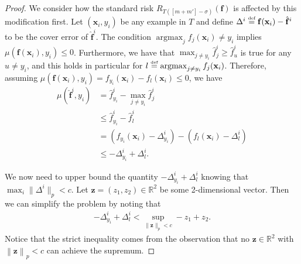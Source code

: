 \documentclass[twoside,11pt]{article}
\newcommand{\norm}[1]{\left\lVert#1\right\rVert}
\newcommand{\f}{\mathbf{f}}
\newcommand{\x}{\mathbf{x}}
\newcommand{\fhat}{\hat{\f}}
\newcommand{\z}{\mathbf{z}}
\newcommand{\reals}{\mathds{R}}
\newcommand{\eqdef}{\overset{\smash{\mbox{\tiny \rm def}}}{=}}
\DeclareMathOperator*{\argmax}{argmax}
\begin{document}
\begin{proof}
We consider how the standard risk $R_{T([m+m']-\sigma)}(\f)$ is affected by this modification first.
Let $(\x_i, y_i)$ be any example in $T$ and define $\Delta^i \eqdef \f(\x_i) - \fhat^i$ to be the cover error of $\fhat^i$.
The condition $\argmax_j f_j(\x_i) \neq y_i$ implies $\mu(\f(\x_i), y_i) \leq 0$.
Furthermore, we have that $\max_{j\ne y_i} \hat{f}_j^i \ge \hat{f}_u^i$ is true for any $u\ne y_i$, and this holds in particular for $l \eqdef \argmax_{j \neq y_i} f_{j}(\x_i)$.
Therefore, assuming $\mu(\f(\x_i), y_i) = f_{y_i}(\x_i) - f_{l}(\x_i) \leq 0$, we have
\begin{align}
    \mu(\fhat^i, y_i)
    &= \hat{f}^i_{y_i} - \max_{j\ne y_i} \hat{f}^i_j\nonumber\\
    &\le \hat{f}^i_{y_i} - \hat{f}^i_l\nonumber\\
    &= (f_{y_i}(\x_i) - \Delta_{y_i}^i) - (f_{l}(\x_i) - \Delta_{l}^i)\nonumber\\
    &\le - \Delta_{y_i}^i + \Delta_{l}^i.\label{eq:margin_classif1}
\end{align}

We now need to upper bound the quantity $-\Delta_{y_i}^i + \Delta_{l}^i$ knowing that $\max_i\lVert\Delta^i\rVert_p<c$.
Let $\z = (z_1, z_2) \in \reals^2$ be some 2-dimensional vector.
Then we can simplify the problem by noting that
\begin{align*}
    -\Delta_{y_i}^i + \Delta_{l}^i < \sup_{\lVert\z\rVert_p < c} -z_1 + z_2.
\end{align*}
Notice that the strict inequality comes from the observation that no $\z \in \reals^2$ with $\norm{\z}_p < c$ can achieve the supremum.


\end{proof}
\end{document}
